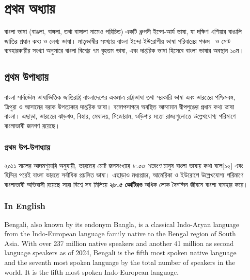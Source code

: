 \section{প্রথম অধ্যায়}
বাংলা ভাষা (বাঙলা, বাঙ্গলা, তথা বাঙ্গালা নামেও পরিচিত) একটি ধ্রুপদী ইন্দো-আর্য ভাষা, যা দক্ষিণ এশিয়ার বাঙালি জাতির প্রধান কথ্য ও লেখ্য ভাষা। মাতৃভাষীর সংখ্যায় বাংলা ইন্দো-ইউরোপীয় ভাষা পরিবারের পঞ্চম~\cite{key} ও মোট ব্যবহারকারীর সংখ্যা অনুসারে বাংলা বিশ্বের ৭ম বৃহত্তম ভাষা, এবং দাপ্তরিক ভাষা হিসেবে বাংলা ভাষার অবস্থান ১০ম।

\subsection{প্রথম উপাধ্যায়}
বাংলা সার্বভৌম ভাষাভিত্তিক জাতিরাষ্ট্র বাংলাদেশের একমাত্র রাষ্ট্রভাষা তথা সরকারি ভাষা এবং ভারতের পশ্চিমবঙ্গ, ত্রিপুরা ও আসামের বরাক উপত্যকার দাপ্তরিক ভাষা। বঙ্গোপসাগরে অবস্থিত আন্দামান দ্বীপপুঞ্জের প্রধান কথ্য ভাষা বাংলা। এছাড়া, ভারতের ঝাড়খণ্ড, বিহার, মেঘালয়, মিজোরাম, ওড়িশার মতো রাজ্যগুলোতে উল্লেখযোগ্য পরিমাণে বাংলাভাষী জনগণ রয়েছে। 

\subsubsection{প্রথম উপ-উপাধ্যায়}
২০১১ সালের আদমশুমারি অনুযায়ী, ভারতের মোট জনসংখ্যার \textit{৮.০৩ শতাংশ} মানুষ বাংলা ভাষায় কথা বলে[১২] এবং হিন্দির পরেই বাংলা ভারতে সর্বাধিক প্রচলিত ভাষা। এছাড়াও মধ্যপ্রাচ্য, আমেরিকা ও ইউরোপে উল্লেখযোগ্য পরিমাণে বাংলাভাষী অভিবাসী রয়েছে সারা বিশ্বে সব মিলিয়ে \textbf{২৮.৫ কোটিরও} অধিক লোক দৈনন্দিন জীবনে বাংলা ব্যবহার করে।

\subsubsection{\englishfont In English}
{\englishfont 
Bengali, also known by its endonym Bangla, is a classical Indo-Aryan language from the Indo-European language family native to the Bengal region of South Asia. With over 237 million native speakers and another 41 million as second language speakers as of 2024, Bengali is the fifth most spoken native language and the seventh most spoken language by the total number of speakers in the world. It is the fifth most spoken Indo-European language.
}